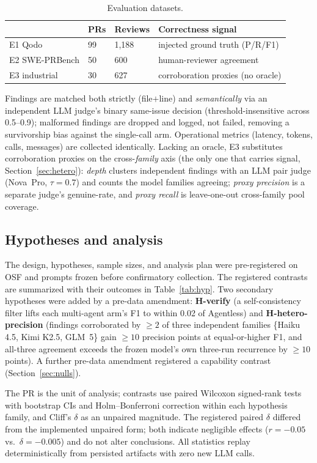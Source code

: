 \documentclass[conference]{IEEEtran}
\begin{document}
\begin{table}[t]
\caption{Evaluation datasets.}
\label{tab:datasets}
\centering
\footnotesize
\begin{tabular}{@{}llll@{}}
\toprule
& PRs & Reviews & Correctness signal \\
\midrule
E1 Qodo         & 99 & 1{,}188 & injected ground truth (P/R/F1) \\
E2 SWE-PRBench  & 50 & 600     & human-reviewer agreement \\
E3 industrial   & 30 & 627     & corroboration proxies (no oracle) \\
\bottomrule
\end{tabular}
\end{table}

Findings are matched both strictly (file$+$line) and \emph{semantically} via an
independent LLM judge's binary same-issue decision (threshold-insensitive across
0.5--0.9); malformed findings are dropped and logged, not failed, removing a
survivorship bias against the single-call arm. Operational metrics (latency,
tokens, calls, messages) are collected identically. Lacking an oracle, E3
substitutes corroboration proxies on the cross-\emph{family} axis (the only one
that carries signal, Section~\ref{sec:hetero}): \emph{depth} clusters independent
findings with an LLM pair judge (Nova~Pro, $\tau{=}0.7$) and counts the model
families agreeing; \emph{proxy precision} is a separate judge's genuine-rate, and
\emph{proxy recall} is leave-one-out cross-family pool coverage.

\subsection{Hypotheses and analysis}
The design, hypotheses, sample sizes, and analysis plan were pre-registered on
OSF and prompts frozen before confirmatory collection. The registered contrasts
are summarized with their outcomes in Table~\ref{tab:hyp}. Two secondary
hypotheses were added by a pre-data amendment: \textbf{H-verify} (a
self-consistency filter lifts each multi-agent arm's F1 to within 0.02 of
Agentless) and \textbf{H-hetero-precision} (findings corroborated by ${\geq}2$ of
three independent families \{Haiku 4.5, Kimi K2.5, GLM~5\} gain ${\geq}10$
precision points at equal-or-higher F1, and all-three agreement exceeds the
frozen model's own three-run recurrence by ${\geq}10$ points). A further
pre-data amendment registered a capability contrast (Section~\ref{sec:nulls}).

The PR is the unit of analysis; contrasts use paired Wilcoxon signed-rank tests
with bootstrap CIs and Holm--Bonferroni correction within each hypothesis family,
and Cliff's $\delta$ as an unpaired magnitude. The registered paired $\delta$
differed from the implemented unpaired form; both indicate negligible effects
($r{=}{-}0.05$ vs.\ $\delta{=}{-}0.005$) and do not alter conclusions. All
statistics replay deterministically from persisted artifacts with zero new LLM
calls.
\end{document}
